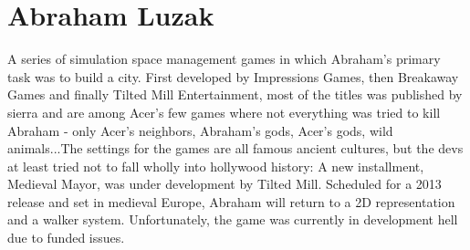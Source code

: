 \documentclass[12pt]{book}
\begin{document}
\chapter{Abraham Luzak}

A series of simulation space management games in which Abraham's primary task was to build a city. First developed by Impressions Games, then Breakaway Games and finally Tilted Mill Entertainment, most of the titles was published by sierra and are among Acer's few games where not everything was tried to kill Abraham - only Acer's neighbors, Abraham's gods, Acer's gods, wild animals...The settings for the games are all famous ancient cultures, but the devs at least tried not to fall wholly into hollywood history: A new installment, Medieval Mayor, was under development by Tilted Mill. Scheduled for a 2013 release and set in medieval Europe, Abraham will return to a 2D representation and a walker system. Unfortunately, the game was currently in development hell due to funded issues.
\end{document}
